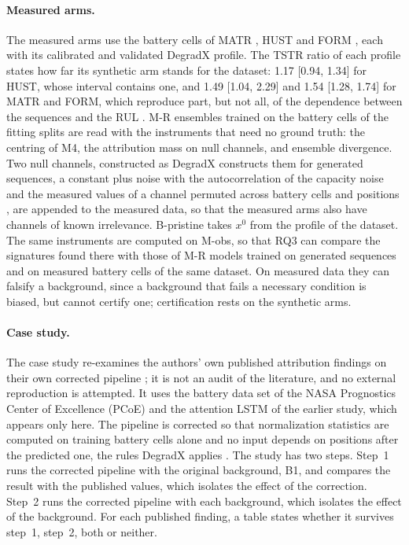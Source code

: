 \documentclass{article}
\begin{document}
\paragraph{Measured arms.} The measured arms use the battery cells of MATR \citep{severson2019data}, HUST \citep{ma2022real} and FORM \citep{cui2024data}, each with its calibrated and validated DegradX profile. The TSTR ratio of each profile states how far its synthetic arm stands for the dataset: 1.17 [0.94, 1.34] for HUST, whose interval contains one, and 1.49 [1.04, 2.29] and 1.54 [1.28, 1.74] for MATR and FORM, which reproduce part, but not all, of the dependence between the sequences and the RUL \citep{degradx2026}. M-R ensembles trained on the battery cells of the fitting splits are read with the instruments that need no ground truth: the centring of M4, the attribution mass on null channels, and ensemble divergence. Two null channels, constructed as DegradX constructs them for generated sequences, a constant plus noise with the autocorrelation of the capacity noise and the measured values of a channel permuted across battery cells and positions \citep{degradx2026}, are appended to the measured data, so that the measured arms also have channels of known irrelevance. B-pristine takes $x^0$ from the profile of the dataset. The same instruments are computed on M-obs, so that RQ3 can compare the signatures found there with those of M-R models trained on generated sequences and on measured battery cells of the same dataset. On measured data they can falsify a background, since a background that fails a necessary condition is biased, but cannot certify one; certification rests on the synthetic arms.

\paragraph{Case study.} The case study re-examines the authors' own published attribution findings on their own corrected pipeline \citep{mishchuk2026explaining}; it is not an audit of the literature, and no external reproduction is attempted. It uses the battery data set of the NASA Prognostics Center of Excellence (PCoE) \citep{saha2007battery} and the attention LSTM of the earlier study, which appears only here.
The pipeline is corrected so that normalization statistics are computed on training battery cells alone and no input depends on positions after the predicted one, the rules DegradX applies \citep{degradx2026}.
The study has two steps. Step~1 runs the corrected pipeline with the original background, B1, and compares the result with the published values, which isolates the effect of the correction. Step~2 runs the corrected pipeline with each background, which isolates the effect of the background. For each published finding, a table states whether it survives step~1, step~2, both or neither.
\end{document}

